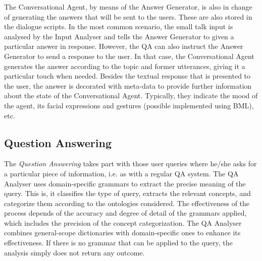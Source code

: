 The Conversational Agent, by means of the Answer Generator, is also in change of generating the answers that will be sent to the users. These are also stored in the dialogue scripts. In the most common scenario, the small talk input is analysed by the Input Analyser and tells the Answer Generator to given a particular answer in response. However, the \ac{QA} can also instruct the Answer Generator to send a response to the user. In that case, the Conversational Agent generates the answer according to the topic and former utterances, giving it a particular touch when needed. Besides the textual response that is presented to the user, the answer is decorated with meta-data to provide further information about the state of the Conversational Agent. Typically, they indicate the mood of the agent, its facial expressions and gestures (possible implemented using \ac{BML}), etc.

\subsection{Question Answering}

The \emph{Question Answering} takes part with those user queries where he/she asks for a particular piece of information, i.e. as with a regular \ac{QA} system. The \ac{QA} Analyser uses domain-specific grammars to extract the precise meaning of the query. This is, it classifies the type of query, extracts the relevant concepts, and categorize them according to the ontologies considered. The effectiveness of the process depends of the accuracy and degree of detail of the grammars applied, which includes the precision of the concept categorization. The \ac{QA} Analyser combines general-scope dictionaries with domain-specific ones to enhance its effectiveness. If there is no grammar that can be applied to the query, the analysis simply does not return any outcome.

